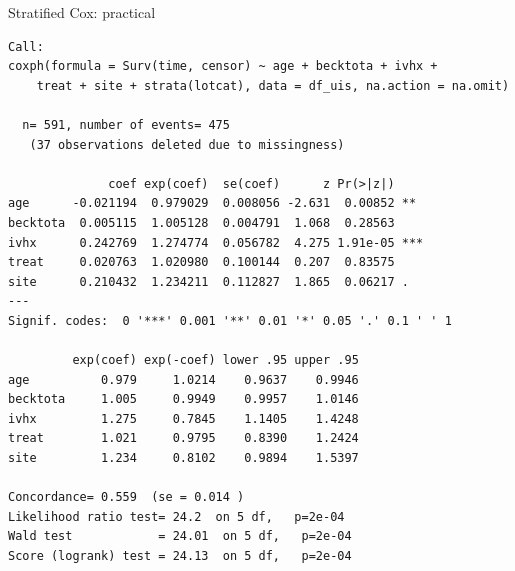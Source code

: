 \documentclass[12pt,english,pdf,xcolor=dvipsnames,aspectratio=169,handout]{beamer}\usepackage[]{graphicx}\usepackage[]{xcolor}
\makeatletter
\newenvironment{kframe}{%
 \def\at@end@of@kframe{}%
 \ifinner\ifhmode%
  \def\at@end@of@kframe{\end{minipage}}%
  \begin{minipage}{\columnwidth}%
 \fi\fi%
 \def\FrameCommand##1{\hskip\@totalleftmargin \hskip-\fboxsep
 \colorbox{shadecolor}{##1}\hskip-\fboxsep
     \hskip-\linewidth \hskip-\@totalleftmargin \hskip\columnwidth}%
 \MakeFramed {\advance\hsize-\width
   \@totalleftmargin\z@ \linewidth\hsize
   \@setminipage}}%
 {\par\unskip\endMakeFramed%
 \at@end@of@kframe}
\newenvironment{knitrout}{}{} %
\makeatother
\begin{document}
\begin{frame}[fragile]{Stratified Cox: practical}
\begin{knitrout}\tiny
{}\color{fgcolor}\begin{kframe}
\begin{verbatim}
Call:
coxph(formula = Surv(time, censor) ~ age + becktota + ivhx + 
    treat + site + strata(lotcat), data = df_uis, na.action = na.omit)

  n= 591, number of events= 475 
   (37 observations deleted due to missingness)

              coef exp(coef)  se(coef)      z Pr(>|z|)    
age      -0.021194  0.979029  0.008056 -2.631  0.00852 ** 
becktota  0.005115  1.005128  0.004791  1.068  0.28563    
ivhx      0.242769  1.274774  0.056782  4.275 1.91e-05 ***
treat     0.020763  1.020980  0.100144  0.207  0.83575    
site      0.210432  1.234211  0.112827  1.865  0.06217 .  
---
Signif. codes:  0 '***' 0.001 '**' 0.01 '*' 0.05 '.' 0.1 ' ' 1

         exp(coef) exp(-coef) lower .95 upper .95
age          0.979     1.0214    0.9637    0.9946
becktota     1.005     0.9949    0.9957    1.0146
ivhx         1.275     0.7845    1.1405    1.4248
treat        1.021     0.9795    0.8390    1.2424
site         1.234     0.8102    0.9894    1.5397

Concordance= 0.559  (se = 0.014 )
Likelihood ratio test= 24.2  on 5 df,   p=2e-04
Wald test            = 24.01  on 5 df,   p=2e-04
Score (logrank) test = 24.13  on 5 df,   p=2e-04
\end{verbatim}
\end{kframe}
\end{knitrout}

\end{frame}
\end{document}
